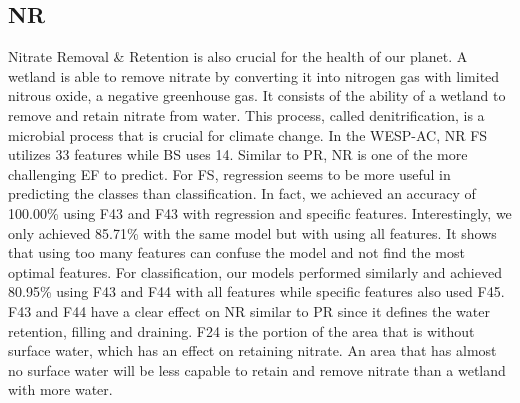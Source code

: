 \documentclass[12pt,letterpaper]{article}
\begin{document}
\subsection{NR}
Nitrate Removal \& Retention is also crucial for the health of our planet.
A wetland is able to remove nitrate by converting it into nitrogen gas with limited nitrous oxide, a negative greenhouse gas.
It consists of the ability of a wetland to remove and retain nitrate from water.
This process, called denitrification, is a microbial process that is crucial for climate change.
In the WESP-AC, \ac{NR} \ac{FS} utilizes 33 features while \ac{BS} uses 14.
Similar to \ac{PR}, \ac{NR} is one of the more challenging \ac{EF} to predict.
For \ac{FS}, regression seems to be more useful in predicting the classes than classification.
In fact, we achieved an accuracy of 100.00\% using F43 and F43 with regression and specific features.
Interestingly, we only achieved 85.71\% with the same model but with using all features.
It shows that using too many features can confuse the model and not find the most optimal features.
For classification, our models performed similarly and achieved 80.95\% using F43 and F44 with all features while specific features also used F45.
F43 and F44 have a clear effect on \ac{NR} similar to \ac{PR} since it defines the water retention, filling and draining.
F24 is the portion of the area that is without surface water, which has an effect on retaining nitrate.
An area that has almost no surface water will be less capable to retain and remove nitrate than a wetland with more water.
\end{document}
